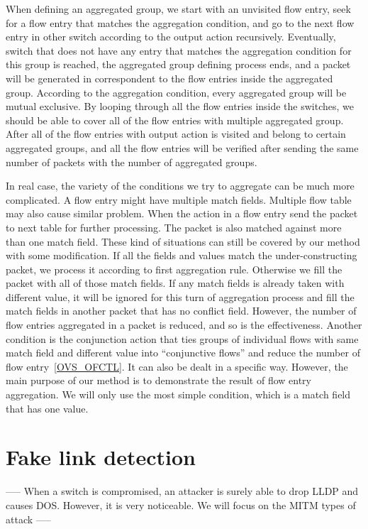 When defining an aggregated group, we start with an unvisited flow entry, seek for a flow entry that matches the aggregation condition, and go to the next flow entry in other switch according to the output action recursively. Eventually, switch that does not have any entry that matches the aggregation condition for this group is reached, the aggregated group defining process ends, and a packet will be generated in correspondent to the flow entries inside the aggregated group. According to the aggregation condition, every aggregated group will be mutual exclusive. By looping through all the flow entries inside the switches, we should be able to cover all of the flow entries with multiple aggregated group. After all of the flow entries with output action is visited and belong to certain aggregated groups, and all the flow entries will be verified after sending the same number of packets with the number of aggregated groups. 

In real case, the variety of the conditions we try to aggregate can be much more complicated. A flow entry might have multiple match fields. Multiple flow table may also cause similar problem. When the action in a flow entry send the packet to next table for further processing. The packet is also matched against more than one match field. These kind of situations can still be covered by our method with some modification. 
If all the fields and values match the under-constructing packet, we process it according to first aggregation rule. Otherwise we fill the packet with all of those match fields. If any match fields is already taken with different value, it will be ignored for this turn of aggregation process and fill the match fields in another packet that has no conflict field. However, the number of flow entries aggregated in a packet is reduced, and so is the effectiveness. Another condition is the conjunction action that ties groups of individual flows with same match field and different value into ``conjunctive  flows'' and reduce the number of flow entry~\ref{OVS_OFCTL}. It can also be dealt in a specific way. However, the main purpose of our method is to demonstrate the result of flow entry aggregation. We will only use the most simple condition, which is a match field that has one value.

\section{Fake link detection}

-----
When a switch is compromised, an attacker is surely able to drop LLDP and causes DOS. However, it is very noticeable. We will focus on the MITM types of attack
-----

